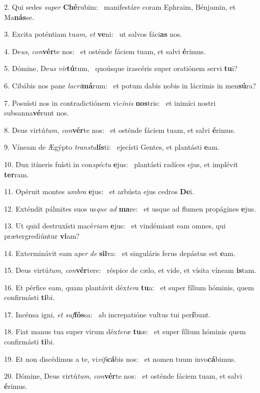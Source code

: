 2. Qui sedes \textit{su}\textit{per} \textbf{Ché}rubim: \ast\  manifestáre coram Ephraim, Bénjamin, et Ma\textbf{nás}se.\

3. Excita poténtiam tu\textit{am}, \textit{et} \textbf{ve}ni: \ast\  ut salvos fáci\textbf{as} nos.\

4. De\textit{us}, \textit{con}\textbf{vér}te nos: \ast\  et osténde fáciem tuam, et salvi \textbf{é}rimus.\

5. Dómine, De\textit{us} \textit{vir}\textbf{tú}tum, \ast\  quoúsque irascéris super oratiónem servi \textbf{tu}i?\

6. Cibábis nos pane \textit{la}\textit{cri}\textbf{má}rum: \ast\  et potum dabis nobis in lácrimis in men\textbf{sú}ra?\

7. Posuísti nos in contradictiónem vi\textit{cí}\textit{nis} \textbf{nos}tris: \ast\  et inimíci nostri subsanna\textbf{vé}runt nos.\

8. Deus virtú\textit{tum}, \textit{con}\textbf{vér}te nos: \ast\  et osténde fáciem tuam, et salvi \textbf{é}rimus.\

9. Víneam de Ægýpto \textit{trans}\textit{tu}\textbf{lís}ti: \ast\  ejecísti Gentes, et plantásti \textbf{e}am.\

10. Dux itíneris fuísti in con\textit{spéc}\textit{tu} \textbf{e}jus: \ast\  plantásti radíces ejus, et implévit \textbf{ter}ram.\

11. Opéruit montes \textit{um}\textit{bra} \textbf{e}jus: \ast\  et arbústa ejus cedros \textbf{De}i.\

12. Exténdit pálmites suos us\textit{que} \textit{ad} \textbf{ma}re: \ast\  et usque ad flumen propágines \textbf{e}jus.\

13. Ut quid destruxísti macé\textit{ri}\textit{am} \textbf{e}jus: \ast\  et vindémiant eam omnes, qui prætergrediúntur \textbf{vi}am?\

14. Exterminávit eam a\textit{per} \textit{de} \textbf{sil}va: \ast\  et singuláris ferus depástus est \textbf{e}am.\

15. Deus virtú\textit{tum}, \textit{con}\textbf{vér}tere: \ast\  réspice de cælo, et vide, et vísita víneam \textbf{is}tam.\

16. Et pérfice eam, quam plantávit déx\textit{te}\textit{ra} \textbf{tu}a: \ast\  et super fílium hóminis, quem confirmásti \textbf{ti}bi.\

17. Incénsa igni, \textit{et} \textit{suf}\textbf{fós}sa: \ast\  ab increpatióne vultus tui per\textbf{í}bunt.\

18. Fiat manus tua super virum déx\textit{te}\textit{ræ} \textbf{tu}æ: \ast\  et super fílium hóminis quem confirmásti \textbf{ti}bi.\

19. Et non discédimus a te, vi\textit{vi}\textit{fi}\textbf{cá}bis nos: \ast\  et nomen tuum invo\textbf{cá}bimus.\

20. Dómine, Deus virtú\textit{tum}, \textit{con}\textbf{vér}te nos: \ast\  et osténde fáciem tuam, et salvi \textbf{é}rimus.\

